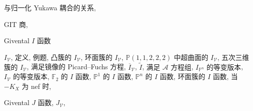 \begin{theindex}
\subitem \leavevmode\hypertarget{idx:0370}{与归一化 Yukawa 耦合的关系},\enspace{}
\indexspace
\item \leavevmode\hypertarget{idx:0381}{GIT 商},\enspace{}
\indexspace
\item \leavevmode\hypertarget{idx:0382}{Givental $I$ 函数}
\subitem \leavevmode\hypertarget{idx:0383}{$I_{\mathcal V}$},\enspace{}
\subsubitem \leavevmode\hypertarget{idx:0384}{定义},\enspace{}
\subsubitem \leavevmode\hypertarget{idx:0385}{例题},\enspace{}
\subsubitem \leavevmode\hypertarget{idx:0386}{凸簇的 $I_{\mathcal V}$},\enspace{}
\subsubitem \leavevmode\hypertarget{idx:0387}{环面簇的 $I_{\mathcal V}$},\enspace{}
\subsubitem \leavevmode\hypertarget{idx:0388}{$\mathbb P(1,1,2,2,2)$ 中超曲面的 $I_{\mathcal V}$},\enspace{}
\subsubitem \leavevmode\hypertarget{idx:0389}{五次三维簇的 $I_{\mathcal V}$},\enspace{}
\subsubitem \leavevmode\hypertarget{idx:0390}{满足镜像的 Picard--Fuchs 方程},\enspace{}
\subitem \leavevmode\hypertarget{idx:0391}{$\overline I_{\mathcal V}$},\enspace{}
\subitem \leavevmode\hypertarget{idx:0392}{$\widetilde I$},\enspace{}
\subsubitem \leavevmode\hypertarget{idx:0393}{满足 $\mathcal A$ 方程组},\enspace{}
\subitem \leavevmode\hypertarget{idx:0394}{$I_{\mathbb P^n}$ 的等变版本},\enspace{}
\subitem \leavevmode\hypertarget{idx:0395}{$I_{\mathcal V}$ 的等变版本},\enspace{}
\subitem \leavevmode\hypertarget{idx:0396}{$\mathbb F_2$ 的 $I$ 函数},\enspace{}
\subitem \leavevmode\hypertarget{idx:0397}{$\mathbb P^1$ 的 $I$ 函数},\enspace{}
\subitem \leavevmode\hypertarget{idx:0398}{$\mathbb P^n$ 的 $I$ 函数},\enspace{}
\subitem \leavevmode\hypertarget{idx:0399}{环面簇的 $I$ 函数},\enspace{}
\subsubitem \leavevmode\hypertarget{idx:0400}{当 $-K_X$ 为 nef 时},\enspace{}
\indexspace
\item \leavevmode\hypertarget{idx:0401}{Givental $J$ 函数},\enspace{}
\subitem \leavevmode\hypertarget{idx:0402}{$J_{\mathcal V}$},\enspace{}

\end{theindex}
